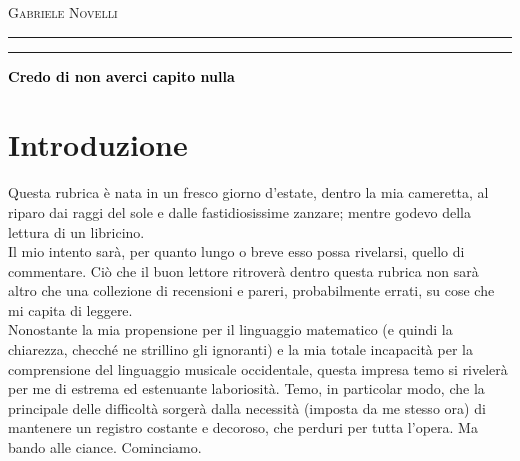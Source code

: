 \documentclass[12pt,a4paper]{report}
\theoremstyle{definition}
\theoremstyle{Theorem}
\theoremstyle{definition}
\theoremstyle{definition}
\theoremstyle{definition}
\begin{document}
	\begin{center}
		{{\Large{\textsc{Gabriele Novelli}}}} 
		\rule[0.1cm]{15.8cm}{0.1mm}
		\rule[0.5cm]{15.8cm}{0.6mm}
	\end{center}
\begin{center}\textcolor{black}{
		{\LARGE{\bf Credo di non averci capito nulla}}
}\end{center}
\tableofcontents
\newpage
\thispagestyle{empty}
\mbox{}
\newpage
\chapter*{Introduzione}
Questa rubrica è nata in un fresco giorno d'estate, dentro la mia cameretta, al riparo dai raggi del sole e dalle fastidiosissime zanzare; mentre godevo della lettura di un libricino.\\
Il mio intento sarà, per quanto lungo o breve esso possa rivelarsi, quello di commentare. Ciò che il buon lettore ritroverà dentro questa rubrica non sarà altro che una collezione di recensioni e pareri, probabilmente errati, su cose che mi capita di leggere.\\
Nonostante la mia propensione per il linguaggio matematico (e quindi la chiarezza, checché ne strillino gli ignoranti) e la mia totale incapacità per la comprensione del linguaggio musicale occidentale, questa impresa temo si rivelerà per me di estrema ed estenuante laboriosità. Temo, in particolar modo, che la principale delle difficoltà sorgerà dalla necessità (imposta da me stesso ora) di mantenere un registro costante e decoroso, che perduri per tutta l'opera. Ma bando alle ciance. Cominciamo.
\end{document}
